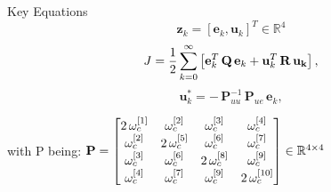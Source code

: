 \documentclass{beamer}
\begin{document}
\begin{frame}{Key Equations}
\begin{equation}
\mathbf{z}_k = \left[\mathbf{e}_k ,\mathbf{u}_k\right]^T\in\mathbb{R}^4
\end{equation}
\begin{equation}
  J =  \frac{1}{2} \sum_{k=0}^\infty\left[{\bf e}_k^T \, {\bf Q} \, {\bf e}_k + {\bf u}_k^T \, {\bf R} \, {\bf u_k}\right],
\end{equation}
\begin{equation}
 \mathbf{u}_k^* = -\,  \mathbf{P}_{uu}^{-1}\, \mathbf{P}_{ue}\, \mathbf{e}_k,
\end{equation}
\begin{center}
with P being:
 ${\bf P}=\begin{bmatrix} 
 2\,\omega_c^{[1]}    & \omega_c^{[2]}      & \omega_c^{[3]}       & \omega_c^{[4]}        \\ 
 \omega_c^{[2]}       &2\, \omega_c^{[5]}   & \omega_c^{[6]}       & \omega_c^{[7]}        \\
 \omega_c^{[3]}       & \omega_c^{[6]}      &2\, \omega_c^{[8]}   & \omega_c^{[9]}   \\   
 \omega_c^{[4]}       & \omega_c^{[7]}      & \omega_c^{[9]}      & 2\,\omega_c^{[10]}      
 \end{bmatrix}\in \mathbb{R}^{4\times 4}$
 \end{center}
\end{frame}
\end{document}
